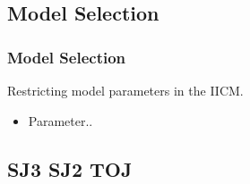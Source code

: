 \documentclass[xcolor={fixpdftex,hyperref,x11names},10pt,pdftex,hyperref={pdftex}]{beamer}
\begin{document}
\subsection{Model Selection}

\begin{frame}
  \frametitle{Model Selection}
  Restricting model parameters in the IICM.

  \begin{itemize}
      \item Parameter..
  \end{itemize}
\end{frame}

\subsection{SJ3 SJ2 TOJ}


%
\end{document}
